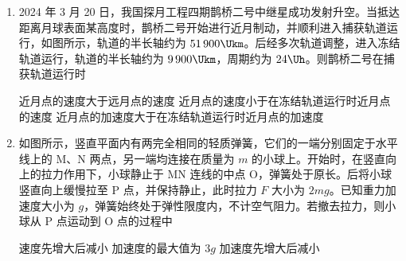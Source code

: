 \documentclass[\gkver]{gaokaozhenti}
\begin{document}
\begin{enumerate}
\item
2024 年 3 月 20 日，我国探月工程四期鹊桥二号中继星成功发射升空。当抵达距离月球表面某高度时，鹊桥二号开始进行近月制动，并顺利进入捕获轨道运行，如图所示，轨道的半长轴约为 $51\,900 \Ukm$。后经多次轨道调整，进入冻结轨道运行，轨道的半长轴约为 $9\,900 \Ukm$，周期约为 $24 \Uh$。则鹊桥二号在捕获轨道运行时


{近月点的速度大于远月点的速度}
{近月点的速度小于在冻结轨道运行时近月点的速度}
{近月点的加速度大于在冻结轨道运行时近月点的加速度}


\item
如图所示，竖直平面内有两完全相同的轻质弹簧，它们的一端分别固定于水平线上的 M、N 两点，另一端均连接在质量为 $m$ 的小球上。开始时，在竖直向上的拉力作用下，小球静止于 MN 连线的中点 O，弹簧处于原长。后将小球竖直向上缓慢拉至 P 点，并保持静止，此时拉力 $F$ 大小为 $2mg$。已知重力加速度大小为 $g$，弹簧始终处于弹性限度内，不计空气阻力。若撤去拉力，则小球从 P 点运动到 O 点的过程中


{速度先增大后减小}
{加速度的最大值为 $3g$}
{加速度先增大后减小}

\end{enumerate}
\end{document}

